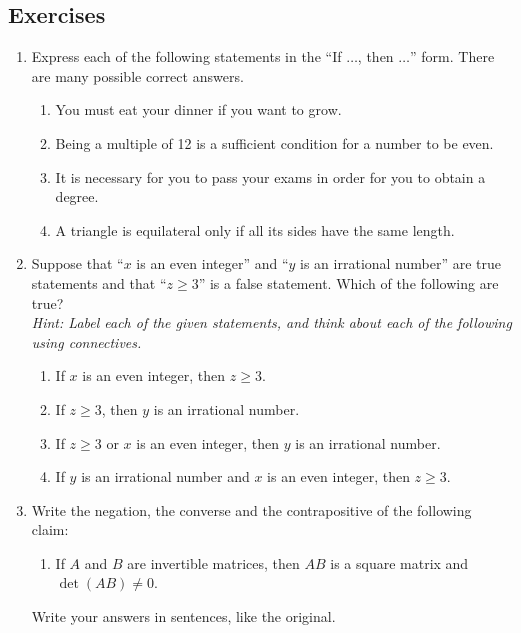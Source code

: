 \subsection*{Exercises}

\begin{enumerate}\renewcommand{\labelenumi}{\thesubsection.\theenumi}  
  \item Express each of the following statements in the ``If $\dots$, then $\dots$'' form. There are many possible correct answers.\prelistskip
		\begin{enumerate}
	  	\item You must eat your dinner if you want to grow.
	  	\item Being a multiple of 12 is a sufficient condition for a number to be even.
	  	\item It is necessary for you to pass your exams in order for you to obtain a degree. 
	  	\item A triangle is equilateral only if all its sides have the same length.
		\end{enumerate}\goodbreak
	
  \item Suppose that ``$x$ is an even integer'' and ``$y$ is an irrational number'' are true statements and that ``$z\geq 3$'' is a false statement. Which of the following are true?\\
  \emph{Hint: Label each of the given statements, and think about each of the following using connectives.}\prelistskip
		\begin{enumerate}
	  	\item If $x$ is an even integer, then $z\geq 3$.
	  	\item If $z\geq 3$, then $y$ is an irrational number.
	  	\item If $z\geq 3$ or $x$ is an even integer, then $y$ is an irrational number.
	  	\item If $y$ is an irrational number and $x$ is an even integer, then $z\geq 3$.
		\end{enumerate}
	
  \item Write the negation, the converse and the contrapositive  of the following claim:\prelistskip
		\begin{enumerate}\setlength{\itemsep}{0pt}
    \item[] If $A$ and $B$ are invertible matrices, then $AB$ is a square matrix and $\det(AB) \neq 0$. 
		\end{enumerate}
  Write your answers in sentences, like the original.


\end{enumerate}
